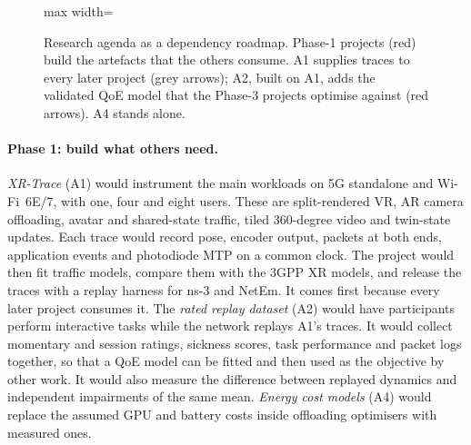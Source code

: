 \begin{figure}[t]
\begin{adjustbox}{max width=\linewidth}
\end{adjustbox}
\caption{Research agenda as a dependency roadmap. Phase-1 projects (red) build the artefacts that the
others consume. A1 supplies traces to every later project (grey arrows); A2, built on A1, adds the
validated QoE model that the Phase-3 projects optimise against (red arrows). A4 stands alone.}\label{fig:roadmap}
\end{figure}

\paragraph{Phase 1: build what others need.} \emph{XR-Trace} (A1) would instrument the main workloads on
5G standalone and Wi-Fi~6E/7, with one, four and eight users. These are split-rendered VR, AR camera
offloading, avatar and shared-state traffic, tiled 360-degree video and twin-state updates. Each trace
would record pose, encoder output, packets at both ends, application events and photodiode MTP on a
common clock. The project would then fit traffic models, compare them with the 3GPP XR models, and release
the traces with a replay harness for ns-3 and NetEm. It comes first because every
later project consumes it. The \emph{rated replay dataset} (A2) would have
participants perform interactive tasks while the network replays A1's traces. It would collect momentary
and session ratings, sickness scores, task performance and packet logs together, so that a QoE model can
be fitted and then used as the objective by other work. It would also measure the difference between
replayed dynamics and independent impairments of the same mean. \emph{Energy cost models} (A4) would
replace the assumed GPU and battery costs inside offloading optimisers with measured ones.

